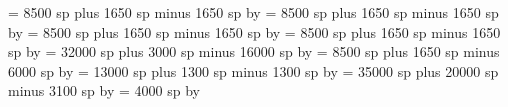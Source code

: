 {%
\spaceafterminor = 8500 sp plus 1650 sp minus 1650 sp%
\multiply\spaceafterminor by \grefactor %
%
\spacebeforemaior = 8500 sp plus 1650 sp minus 1650 sp%
\multiply\spacebeforemaior by \grefactor %
%
\spaceaftermaior = 8500 sp plus 1650 sp minus 1650 sp%
\multiply\spaceaftermaior by \grefactor %
%
\spacebeforefinalis = 8500 sp plus 1650 sp minus 1650 sp%
\multiply\spacebeforefinalis by \grefactor %
%
\spacebeforefinalfinalis= 32000 sp plus 3000 sp minus 16000 sp%
\multiply\spacebeforefinalfinalis by \grefactor %
%
\spaceafterfinalis = 8500 sp plus 1650 sp minus 6000 sp%
\multiply\spaceafterfinalis by \grefactor %
%
\textbartextspace = 13000 sp plus 1300 sp minus 1300 sp%
\multiply\textbartextspace by \grefactor %
%
\notebarspace = 35000 sp plus 20000 sp minus 3100 sp%
\multiply\notebarspace by \grefactor %
%
\maximumspacewithoutdash = 4000 sp%
\multiply\maximumspacewithoutdash by \grefactor %
\relax %
}
